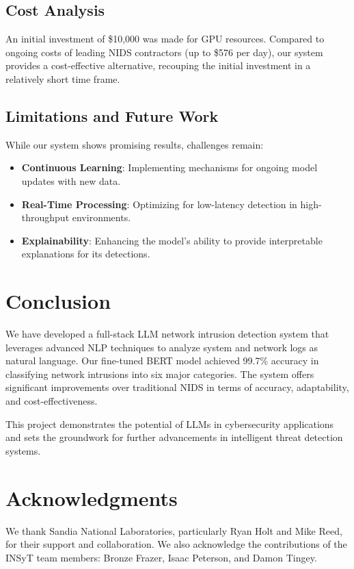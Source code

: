 \documentclass[12pt]{article}
\begin{document}
\subsection{Cost Analysis}

An initial investment of \$10,000 was made for GPU resources. Compared to ongoing costs of leading NIDS contractors (up to \$576 per day), our system provides a cost-effective alternative, recouping the initial investment in a relatively short time frame.

\subsection{Limitations and Future Work}

While our system shows promising results, challenges remain:

\begin{itemize}
    \item \textbf{Continuous Learning}: Implementing mechanisms for ongoing model updates with new data.
    \item \textbf{Real-Time Processing}: Optimizing for low-latency detection in high-throughput environments.
    \item \textbf{Explainability}: Enhancing the model's ability to provide interpretable explanations for its detections.
\end{itemize}

\section{Conclusion}

We have developed a full-stack LLM network intrusion detection system that leverages advanced NLP techniques to analyze system and network logs as natural language. Our fine-tuned BERT model achieved 99.7\% accuracy in classifying network intrusions into six major categories. The system offers significant improvements over traditional NIDS in terms of accuracy, adaptability, and cost-effectiveness.

This project demonstrates the potential of LLMs in cybersecurity applications and sets the groundwork for further advancements in intelligent threat detection systems.

\section*{Acknowledgments}

We thank Sandia National Laboratories, particularly Ryan Holt and Mike Reed, for their support and collaboration. We also acknowledge the contributions of the INSyT team members: Bronze Frazer, Isaac Peterson, and Damon Tingey.
\end{document}
